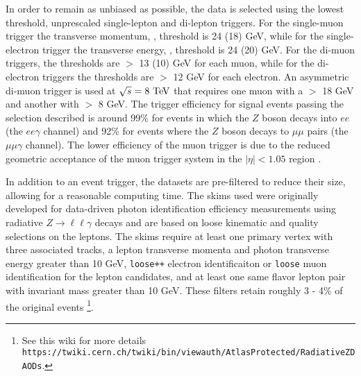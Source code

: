 In order to remain as unbiased as possible, the data is selected using the lowest
threshold, unprescaled single-lepton and di-lepton triggers. For the
single-muon trigger the transverse momentum, \pt, threshold is 24 (18) GeV, while
for the single-electron trigger the transverse energy, \et, threshold is 24 (20) GeV.
For the di-muon triggers, the thresholds are \pt $>$ 13 (10) GeV for each muon, while
for the di-electron triggers the thresholds are \et $>$ 12 GeV for each electron.
An asymmetric di-muon trigger is used at $\rts = 8 \TeV$ that requires one muon with 
a \pt $>$ 18 GeV and another with \pt $>$ 8 GeV. 
The trigger efficiency for signal
events passing the selection described is around 99\% for events in which the
$Z$ boson decays into $ee$ (the $ee\gamma$ channel) and 92\% for events where
the $Z$ boson decays to $\mu\mu$ pairs (the $\mu\mu\gamma$ channel). The lower
efficiency of the muon trigger is due to the reduced geometric acceptance of the muon
trigger system in the $|\eta| < 1.05$ region \cite{ATLAS-CONF-2013-009}.

In addition to an event trigger, the datasets are pre-filtered to 
reduce their size, allowing for a reasonable computing time.
The skims used were originally developed for data-driven photon identification
efficiency measurements using radiative $Z \to \ell\ell\gamma$ decays and
are based on loose kinematic and quality selections on the leptons. The
skims require at least one primary vertex with three associated tracks,
a lepton transverse momenta and photon transverse energy greater than 10 GeV,
{\tt loose++} electron identificaiton or {\tt loose} muon identification for
the lepton candidates, and at least one same flavor lepton pair with invariant mass
greater than 10 GeV. These filters retain roughly 3 - 4\% of the original events
\footnote{See this wiki for more details 
{\tt https://twiki.cern.ch/twiki/bin/viewauth/AtlasProtected/RadiativeZDAODs}.}.

